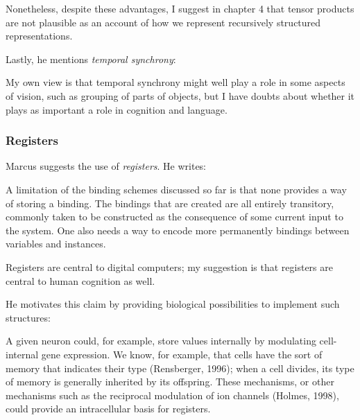 \documentclass[../../main.tex]{subfiles}
\begin{document}
\begin{citecallout}
    Nonetheless, despite these advantages, I suggest in chapter 4
    that tensor products are not plausible as an account of how we represent
    recursively structured representations.
\end{citecallout}

Lastly, he mentions \emph{temporal synchrony}:

\begin{citecallout}
    My own view is that temporal synchrony might well play a role in
    some aspects of vision, such as grouping of parts of objects, but I have
    doubts about whether it plays as important a role in cognition and language.
\end{citecallout}

\subsubsection{Registers}
Marcus suggests the use of \emph{registers}. He writes:

\begin{citecallout}
    A limitation of the binding schemes discussed so far is that none provides a way of storing a binding. The bindings that are created are all entirely transitory, commonly taken to be constructed as the consequence
    of some current input to the system. One also needs a way to encode
    more permanently bindings between variables and instances.
\end{citecallout}

\begin{citecallout}
    Registers are central to digital computers; my suggestion is that registers are central to human cognition as well.
\end{citecallout}

He motivates this claim by providing biological possibilities to implement such structures:

\begin{citecallout}
    A given neuron could, for
    example, store values internally by modulating cell-internal gene expression. We know, for example, that cells have the sort of memory that
    indicates their type (Rensberger, 1996); when a cell divides, its type of
    memory is generally inherited by its offspring. These mechanisms, or
    other mechanisms such as the reciprocal modulation of ion channels
    (Holmes, 1998), could provide an intracellular basis for registers.
\end{citecallout}
\end{document}
